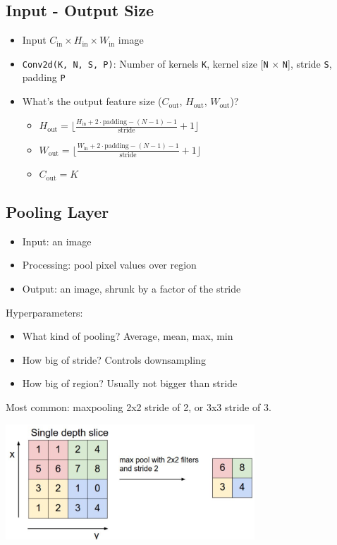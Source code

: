 \documentclass[10pt]{article}
\begin{document}
\subsection*{Input - Output Size}
\begin{itemize}
	\item Input $C_{\text{in}} \times H_{\text{in}} \times W_{\text{in}}$ image
	\item \texttt{Conv2d(K, N, S, P)}: Number of kernels \texttt{K}, kernel size [\texttt{N} $\times$ \texttt{N}], stride \texttt{S}, padding \texttt{P}
	\item What's the output feature size ($C_{\text{out}}$, $H_{\text{out}}$, $W_{\text{out}}$)?
	\begin{itemize}
        \item $H_{\text{out}} = \lfloor \frac{H_{\text{in}} + 2 \cdot \text{padding} - (N - 1) - 1}{\text{stride}} + 1 \rfloor$
        \item $W_{\text{out}} = \lfloor \frac{W_{\text{in}} + 2 \cdot \text{padding} - (N - 1) - 1}{\text{stride}} + 1 \rfloor$
        \item $C_{\text{out}} = K$
    \end{itemize}
\end{itemize}

\subsection*{Pooling Layer}
\begin{itemize}
	\item Input: an image
	\item Processing: pool pixel values over region
	\item Output: an image, shrunk by a factor of the stride
\end{itemize}
Hyperparameters:
\begin{itemize}
	\item What kind of pooling?  Average, mean, max, min
	\item How big of stride?  Controls downsampling
	\item How big of region?  Usually not bigger than stride
\end{itemize}
Most common: maxpooling 2x2 stride of 2, or 3x3 stride of 3.
\begin{center} 
	\includegraphics*[width=0.7\textwidth]{L2_20.png} 
\end{center}
\end{document}
